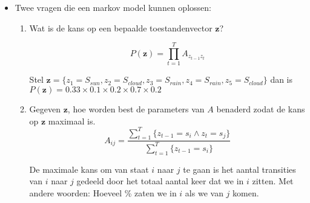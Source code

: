 \begin{itemize}
	\item Twee vragen die een markov model kunnen oplossen:
	\begin{enumerate}
		\item Wat is de kans op een bepaalde toestandenvector $\textbf{z}$?

				$$	P(\textbf{z})  = \prod_{t=1}^{T} A_{z_{t-1}z_t}$$

			Stel $\textbf{z} = \{z_1=S_{sun},z_2=S_{cloud},z_3=S_{rain},z_4=S_{rain},z_5=S_{cloud}\}$ dan is $P(\textbf{z}) = 0.33 \times 0.1 \times 0.2 \times 0.7 \times 0.2 $
		\item Gegeven $\textbf{z}$, hoe worden best de parameters van $A$ benaderd zodat de kans op $\textbf{z}$ maximaal is.
		$$A_{ij} = \frac{\sum_{t=1}^{T} \{z_{t-1} = s_i \wedge z_t = s_j\}}{\sum_{t=1}^{T} \{z_{t-1} = s_i\}}$$
		
		De maximale kans om van staat $i$ naar $j$ te gaan is het aantal transities van $i$ naar $j$ gedeeld door het totaal aantal keer dat we in $i$ zitten. Met andere woorden: Hoeveel \% zaten we in $i$ als we van $j$ komen.
	\end{enumerate}
\end{itemize}

